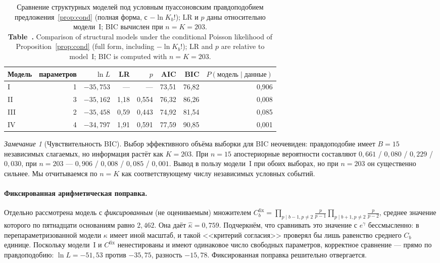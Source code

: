 \documentclass[11pt,a4paper]{article}
\newcommand{\encaptab}[1]{\\[3pt]\foreignlanguage{english}{%
  \textbf{Table~\thetable.} #1}}
\theoremstyle{plain}
\theoremstyle{remark}
\newtheorem{remark}{Замечание}
\newcommand{\eg}{e^{\gamma}}
\begin{document}
\begin{table}[t]
\centering
\caption{Сравнение структурных моделей под условным пуассоновским правдоподобием
предложения~\ref{prop:cond} (полная форма, с $-\ln K_b!$); LR и $p$ даны относительно
модели~I; BIC вычислен при $n=K=203$.
\encaptab{Comparison of structural models under the conditional Poisson likelihood of
Proposition~\ref{prop:cond} (full form, including $-\ln K_b!$); LR and $p$ are
relative to model~I; BIC is computed with $n=K=203$.}}
\label{tab:struct}
\small
\begin{tabular}{lrrrrrrr}
\toprule
Модель & параметров & $\ln L$ & LR & $p$ & AIC & BIC & $P(\text{модель}\mid\text{данные})$\\
\midrule
I & 1 & $-35{,}753$ & --- & --- & 73{,}51 & 76{,}82 & 0{,}906\\
II & 3 & $-35{,}162$ & 1{,}18 & 0{,}554 & 76{,}32 & 86{,}26 & 0{,}008\\
III & 2 & $-35{,}458$ & 0{,}59 & 0{,}443 & 74{,}92 & 81{,}54 & 0{,}085\\
IV & 4 & $-34{,}797$ & 1{,}91 & 0{,}591 & 77{,}59 & 90{,}85 & 0{,}001\\
\bottomrule
\end{tabular}
\end{table}

\begin{remark}[Чувствительность BIC]
Выбор эффективного объёма выборки для BIC неочевиден: правдоподобие имеет
$B=15$ независимых слагаемых, но информация растёт как $K=203$. При $n=15$
апостериорные вероятности составляют $0{,}661$ / $0{,}080$ / $0{,}229$ / $0{,}030$,
при $n=203$ --- $0{,}906$ / $0{,}008$ / $0{,}085$ / $0{,}001$. Вывод в пользу модели~I
при обоих выборах, но при $n=203$ он существенно сильнее. Мы отчитываемся по
$n=K$ как соответствующему числу независимых условных событий.
\end{remark}

\paragraph{Фиксированная арифметическая поправка.} Отдельно рассмотрена модель с
\emph{фиксированным} (не оцениваемым) множителем
$C^{\mathrm{fix}}_b=\prod_{p\mid b-1,p\ne2}\frac{p}{p-1}\prod_{p\mid b+1,p\ne2}\frac{p}{p-2}$,
среднее значение которого по пятнадцати основаниям равно $2{,}462$. Она даёт
$\hat\kappa=0{,}759$. Подчеркнём, что сравнивать это значение с $\eg$ бессмысленно:
в перепараметризованной модели $\kappa$ имеет иной масштаб, и такой <<критерий
согласия>> проверял бы лишь равенство среднего $C_b$ единице. Поскольку модели~I и
$C^{\mathrm{fix}}$ ненестированы и имеют одинаковое число свободных параметров,
корректное сравнение --- прямо по правдоподобию: $\ln L=-51{,}53$ против $-35{,}75$,
разность $-15{,}78$. Фиксированная поправка решительно отвергается.
\end{document}
